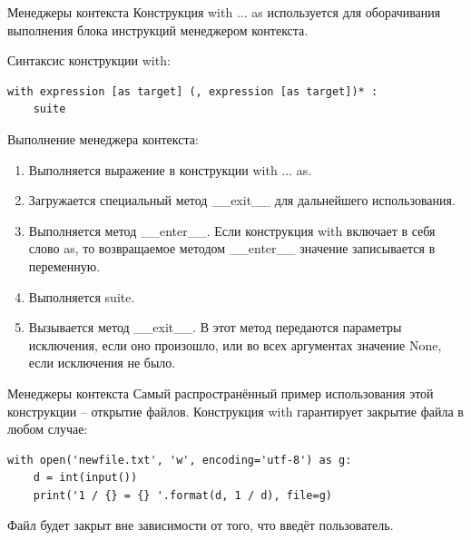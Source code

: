 \documentclass[xcolor=table]{beamer}
\begin{document}
\begin{frame}[fragile]{Менеджеры контекста}
	Конструкция with ... as используется для оборачивания выполнения блока инструкций менеджером контекста. 		

	Синтаксис конструкции with:

	\begin{verbatim}
with expression [as target] (, expression [as target])* :
	suite
	\end{verbatim}
	
	Выполнение менеджера контекста:
	\begin{enumerate}
\item Выполняется выражение в конструкции with ... as.
		\item Загружается специальный метод \_\_exit\_\_ для дальнейшего использования.
		\item Выполняется метод \_\_enter\_\_. Если конструкция with включает в себя слово as, то возвращаемое методом \_\_enter\_\_ значение записывается в переменную.
		\item Выполняется suite.
		\item Вызывается метод \_\_exit\_\_. В этот метод передаются параметры исключения, если оно произошло, или во всех аргументах значение None, если исключения не было.
	\end{enumerate}
\end{frame}

\begin{frame}[fragile]{Менеджеры контекста}
	Самый распространённый пример использования этой конструкции -- открытие файлов. Конструкция with гарантирует закрытие файла в любом случае:

	\begin{verbatim}
with open('newfile.txt', 'w', encoding='utf-8') as g:
	d = int(input())
	print('1 / {} = {} '.format(d, 1 / d), file=g)
	\end{verbatim}
	
	Файл будет закрыт вне зависимости от того, что введёт пользователь.
\end{frame}
\end{document}
